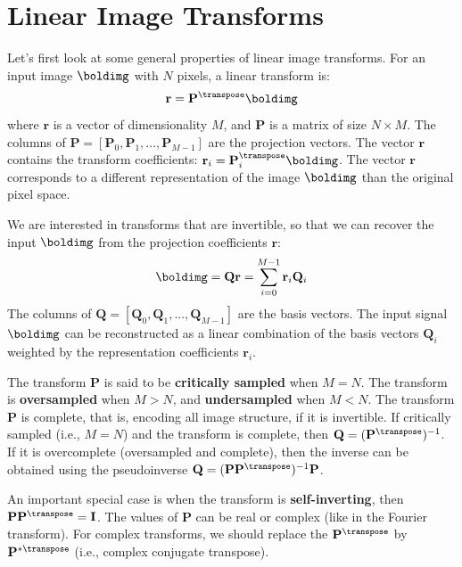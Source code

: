 \section{Linear Image Transforms}

Let's first look at some general properties of linear image transforms.  For an input image $\boldimg$ with $N$ pixels, a linear transform is:
\begin{equation}
\mathbf{r} = \mathbf{P}^\transpose \boldimg 
\end{equation}
where $\mathbf{r}$ is a vector of dimensionality $M$, and $\mathbf{P}$ is a matrix of size $N \times M$. The columns of $\mathbf{P} = \left[\mathbf{P}_0,  \mathbf{P}_1, ...,\mathbf{P}_{M-1}\right]$ are the projection vectors. The vector $\mathbf{r}$ contains the transform coefficients: $\mathbf{r}_i = \mathbf{P}_i^\transpose \boldimg$.  The vector $\mathbf{r}$ corresponds to a different representation of the image $\boldimg$ than the original pixel space. 


We are interested in transforms that are invertible, 
so that we can recover the input $\boldimg$ from the projection coefficients $\mathbf{r}$:
\begin{equation}
\boldimg = \mathbf{Q} \mathbf{r} = \sum_{i=0}^{M-1} \mathbf{r}_i \mathbf{Q}_i 
\end{equation}
The columns of $\mathbf{Q}= \left[\mathbf{Q}_0,  \mathbf{Q}_1, ...,\mathbf{Q}_{M-1}\right]$ are the basis vectors. The input signal $\boldimg$ can be reconstructed as a linear combination of the basis vectors $\mathbf{Q}_i$ weighted by the representation coefficients $\mathbf{r}_i$.  

The transform $\mathbf{P}$ is said to be {\bf critically sampled} when $M=N$.  The transform is {\bf oversampled} when $M > N$, and {\bf undersampled} when $M < N$. 
The transform $\mathbf{P}$ is complete, that is, encoding all image structure, if it is invertible. If critically sampled (i.e., $M=N$) and the transform is complete, then $\mathbf{Q} = (\mathbf{P}^\transpose)^{-1}$.  If it is overcomplete (oversampled and complete), then the inverse can be obtained using the pseudoinverse $\mathbf{Q}=(\mathbf{P} \mathbf{P}^\transpose)^{-1}\mathbf{P}$.

An important special case is when the transform is {\bf self-inverting},
then $\mathbf{P} \mathbf{P}^{\transpose} = \mathbf{I}$. The values of $\mathbf{P}$ can be real or complex (like in the Fourier transform). For complex transforms, we should replace the $\mathbf{P}^\transpose$ by $\mathbf{P}^{*\transpose}$ (i.e., complex conjugate transpose).

